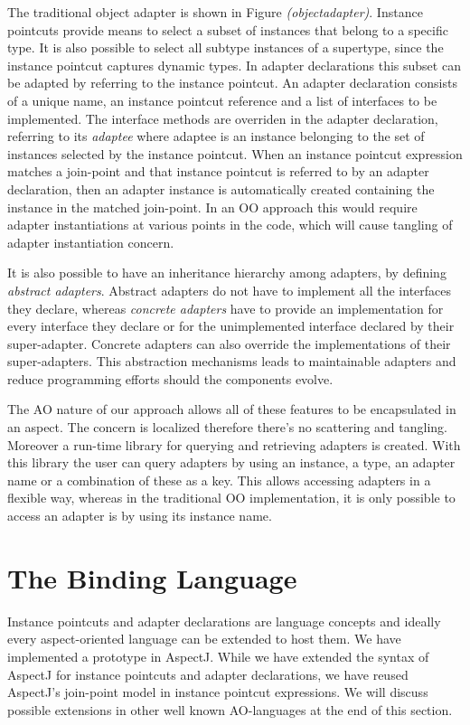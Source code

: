 \documentclass{llncs}
\begin{document}
The traditional object adapter is shown in Figure \textsl{(objectadapter)}. Instance pointcuts provide means to select a subset of instances that belong to a specific type. It is also possible to select all subtype instances of a supertype, since the instance pointcut captures dynamic types. In adapter declarations this subset can be adapted by referring to the instance pointcut. An adapter declaration consists of a unique name, an instance pointcut reference and a list of interfaces to be implemented. The interface methods are overriden in the adapter declaration, referring to its \emph{adaptee} where adaptee is an instance belonging to the set of instances selected by the instance pointcut. When an instance pointcut expression matches a join-point and that instance pointcut is referred to by an adapter declaration, then an adapter instance is automatically created containing the instance in the matched join-point.  In an OO approach this would require adapter instantiations at various points in the code, which will cause tangling of adapter instantiation concern. 

It is also possible to have an inheritance hierarchy among adapters, by defining \emph{abstract adapters}. Abstract adapters do not have to implement all the interfaces they declare, whereas \emph{concrete adapters} have to provide an implementation for every interface they declare or for the unimplemented interface declared by their super-adapter. Concrete adapters can also override the implementations of their super-adapters. This abstraction mechanisms leads to maintainable adapters and reduce programming efforts should the components evolve.

The AO nature of our approach allows all of these features to be encapsulated in an aspect. The concern is localized therefore there's no scattering and tangling. Moreover a run-time library for querying and retrieving adapters is created. With this library the user can query adapters by using an instance, a type, an adapter name or a combination of these as a key. This allows accessing adapters in a flexible way, whereas in the traditional OO implementation, it is only possible to access an adapter is by using its instance name.  


\section{The Binding Language}

Instance pointcuts and adapter declarations are language concepts and ideally every aspect-oriented language can be extended to host them. We have implemented a prototype in AspectJ. While we have extended the syntax of AspectJ for instance pointcuts and adapter declarations, we have reused AspectJ's join-point model in instance pointcut expressions.  We will discuss possible extensions in other well known AO-languages at the end of this section. 
\end{document}
